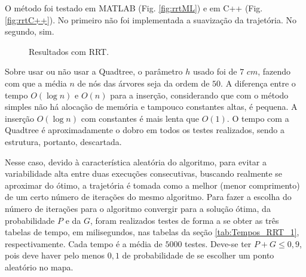 \documentclass[a4paper,12pt]{article}
\begin{document}
O método foi testado em MATLAB (Fig. \ref{fig:rrtML}) e em C++ (Fig. \ref{fig:rrtC++}). No primeiro não foi implementada a suavização da trajetória. No segundo, sim.

\begin{figure}
\caption{Resultados com RRT.}
\end{figure}

Sobre usar ou não usar a Quadtree, o parâmetro $h$ usado foi de $7$ $cm$, fazendo com que a média $n$ de nós das árvores seja da ordem de $50$. A diferença entre o tempo $O(\log{n})$ e $O(n)$ para a inserção, considerando que com o método simples não há alocação de memória e tampouco constantes altas, é pequena. A inserção $O(\log{n})$ com constantes é mais lenta que $O(1)$. O tempo com a Quadtree é aproximadamente o dobro em todos os testes realizados, sendo a estrutura, portanto, descartada.

Nesse caso, devido à característica aleatória do algoritmo, para evitar a variabilidade alta entre duas execuções consecutivas, buscando realmente se aproximar do ótimo, a trajetória é tomada como a melhor (menor comprimento) de um certo número de iterações do mesmo algoritmo. Para fazer a escolha do número de iterações para o algoritmo convergir para a solução ótima, da probabilidade $P$ e da $G$, foram realizados testes de forma a se obter as três tabelas de tempo, em milisegundos, nas tabelas da seção \ref{tab:Tempos_RRT_1}, respectivamente. Cada tempo é a média de $5000$ testes. Deve-se ter $P + G \leq 0,9$, pois deve haver pelo menos $0,1$ de probabilidade de se escolher um ponto aleatório no mapa.
\end{document}
